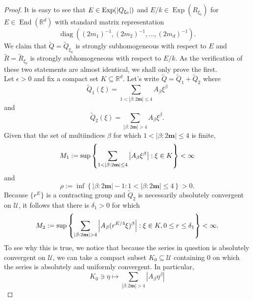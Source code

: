 \documentclass[11pt, letter]{book}
\newcommand\End{\operatorname{End}} %
\newcommand\Exp{\operatorname{Exp}}
\newcommand\diag{\operatorname{diag}}
\begin{document}
\begin{proof}
It is easy to see that $E\in \Exp(\abs{Q_{\xi_0}})$ and $E/k\in\Exp(R_{\xi_0})$ for $E\in\End(\mathbb{R}^d)$ with standard matrix representation 
\begin{equation*}
\diag((2m_1)^{-1}, (2m_2)^{-1},\dots, (2m_d)^{-1}).
\end{equation*}
We claim that $\widetilde{Q}=\widetilde{Q}_{\xi_0}$ is strongly subhomogeneous with respect to $E$ and $\widetilde{R}=\widetilde{R}_{\xi_0}$ is strongly subhomogeneous with respect to $E/k$. As the verification of these two statements are almost identical, we shall only prove the first.\\

\noindent Let $\epsilon > 0$ and fix a compact set $K\subseteq\mathbb{R}^d$. Let's write $\widetilde{Q}=\widetilde{Q}_1+\widetilde{Q}_2$ where
\begin{equation*}
    \widetilde{Q}_1(\xi)=\sum_{1< |\beta:2\mathbf{m}|\leq 4}A_{\beta}\xi^\beta
\end{equation*}
and
\begin{equation*}
    \widetilde{Q}_2(\xi)=\sum_{ |\beta:2\mathbf{m}|>4}A_{\beta}\xi^\beta.
\end{equation*}
Given that the set of multiindices $\beta$ for which  $1<|\beta:2\mathbf{m}|\leq 4$ is finite, 
\begin{equation*}
    M_1:=\sup\left\{\sum_{1<|\beta:2\mathbf{m}|\leq 4} \abs{A_\beta\xi^\beta}:\xi\in K\right\}<\infty
\end{equation*}
and
\begin{equation*}
    \rho:=\inf\left\{|\beta:2\mathbf{m}|-1:1<|\beta:2\mathbf{m}|\leq 4\right\}>0.
\end{equation*}
Because $\{r^E\}$ is a contracting group and $\widetilde{Q}_2$ is necessarily absolutely convergent on $\mathcal{U}$, it follows that there is $\delta_1>0$ for which
\begin{equation*}
    M_2:=\sup\left\{\sum_{|\beta:2\mathbf{m}|>4}\abs{A_\beta(r^{E/4}\xi)^\beta}:\xi\in K, 0\leq r\leq\delta_1\right\}<\infty.
\end{equation*}
To see why this is true, we notice that because the series in question is absolutely convergent on $\mathcal{U}$, we can take a compact subset $K_0 \subseteq \mathcal{U}$ containing $0$ on which the series is absolutely and uniformly convergent. In particular, 
\begin{equation*}
    K_0 \ni \eta \mapsto \sum_{|\beta:2\mathbf{m}|>4}|A_{\beta}\eta^\beta|
\end{equation*}

\end{proof}
\end{document}
